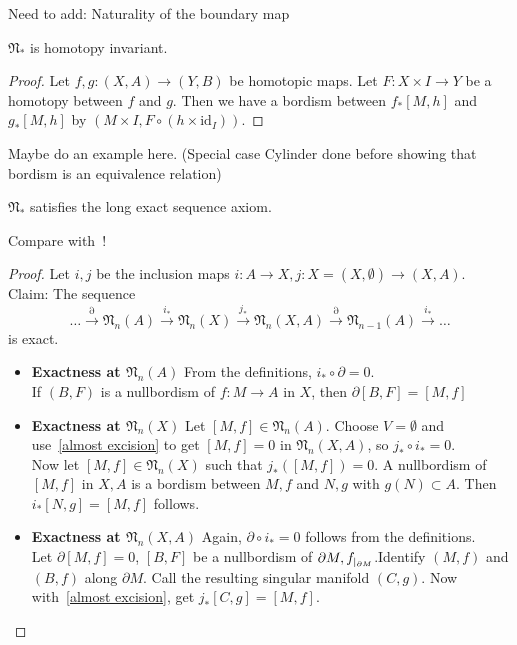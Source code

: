 \documentclass[a4paper,11pt]{article}
\begin{document}
Need to add: Naturality of the boundary map

\begin{lemma}\cite[II, Satz 3.1]{brocker}\label{htpy inv}
    \(\mathfrak{N}_\ast\) is homotopy invariant.
\end{lemma}

\begin{proof}\cite{brocker}
    Let \(f,g:(X,A)\to(Y,B)\) be homotopic maps. Let \(F:X\times I\to Y\) be a homotopy between \(f\) and \(g\). Then we have a bordism between \(f_\ast[M,h]\) and \(g_\ast[M,h]\) by \((M\times I, F\circ (h\times\mathrm{id}_I))\).
\end{proof}

Maybe do an example here. (Special case Cylinder done before showing that bordism is an equivalence relation)

\begin{lemma}\label{les}
    \(\mathfrak{N}_\ast\) satisfies the long exact sequence axiom.
\end{lemma}

Compare with\ \cite{zhang}!

\begin{proof}\cite{dieck}
    Let \(i,j\) be the inclusion maps \(i:A\to X, j:X=(X,\emptyset)\to(X,A)\).\\
    Claim: The sequence
    \[\dots\xrightarrow{\partial}\mathfrak{N}_n(A)\xrightarrow{i_\ast}\mathfrak{N}_n(X)\xrightarrow{j_\ast}\mathfrak{N}_n(X,A)\xrightarrow{\partial}\mathfrak{N}_{n-1}(A)\xrightarrow{i_\ast}\dots\]
    is exact.
    \begin{itemize}
        \item \textbf{Exactness at \(\mathfrak{N}_n(A)\)} From the definitions, \(i_\ast\circ \partial=0\).\\
        If \((B,F)\) is a nullbordism of \(f:M\to A\) in \(X\), then \(\partial[B,F]=[M,f]\)
        \item \textbf{Exactness at \(\mathfrak{N}_n(X)\)} Let \([M,f]\in\mathfrak{N}_n(A)\). Choose \(V=\emptyset\) and use\ \ref{almost excision} to get \([M,f]=0\) in \(\mathfrak{N}_n(X,A)\), so \(j_\ast\circ i_\ast=0\).\\
        Now let \([M,f]\in\mathfrak{N}_n(X)\) such that \(j_\ast([M,f])=0\). A nullbordism of \([M,f]\) in \(X,A\) is a bordism between \(M,f\) and \(N,g\) with \(g(N)\subset A\). Then \(i_\ast[N,g]=[M,f]\) follows.
        \item \textbf{Exactness at \(\mathfrak{N}_n(X,A)\)} Again, \(\partial \circ i_\ast=0\) follows from the definitions.\\
        Let \(\partial[M,f]=0\), \([B,F]\) be a nullbordism of \(\partial M, f_{|_{\partial M}}\).Identify \((M,f)\) and \((B,f)\) along \(\partial M\). Call the resulting singular manifold \((C,g)\). Now with\ \ref{almost excision}, get \(j_\ast[C,g]=[M,f]\).
    \end{itemize}
\end{proof}
\end{document}

